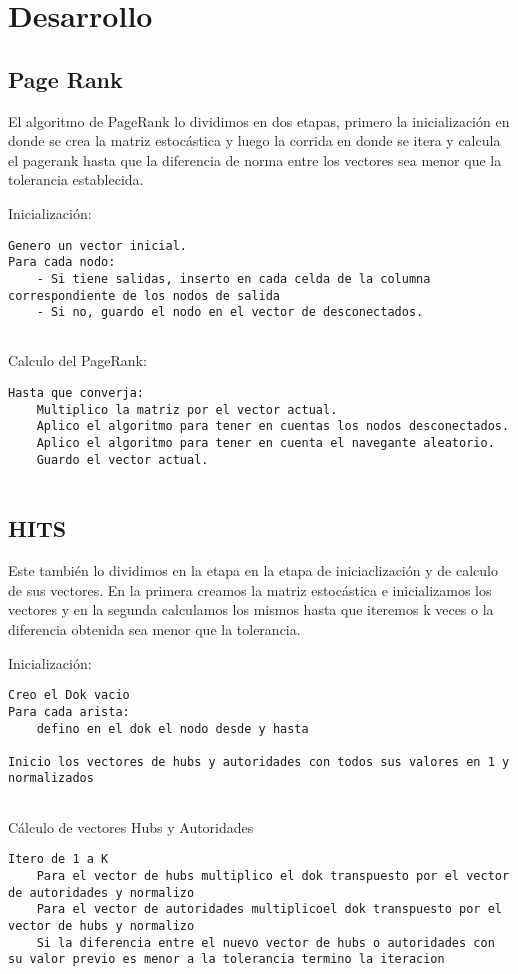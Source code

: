 \section{Desarrollo}

\subsection{Page Rank}
El algoritmo de PageRank lo dividimos en dos etapas, primero la inicializaci\'on en donde se crea la matriz estoc\'astica y luego la corrida en donde se itera y calcula el pagerank hasta que la diferencia de norma entre los vectores sea menor que la tolerancia establecida.

Inicializaci\'on:
\begin{lstlisting}[frame=single]  
Genero un vector inicial.
Para cada nodo:
	- Si tiene salidas, inserto en cada celda de la columna correspondiente de los nodos de salida
	- Si no, guardo el nodo en el vector de desconectados.
	
\end{lstlisting}

Calculo del PageRank:
\begin{lstlisting}[frame=single] 
Hasta que converja:
	Multiplico la matriz por el vector actual.
	Aplico el algoritmo para tener en cuentas los nodos desconectados.
	Aplico el algoritmo para tener en cuenta el navegante aleatorio.
	Guardo el vector actual.
	
\end{lstlisting}


\subsection{HITS}
Este también lo dividimos en la etapa en la etapa de iniciaclización y de calculo de sus vectores. En la primera creamos la matriz estocástica e inicializamos los vectores y en la segunda calculamos los mismos hasta que iteremos k veces o la diferencia obtenida sea menor que la tolerancia.

Inicializaci\'on:
\begin{lstlisting}[frame=single]  
Creo el Dok vacio
Para cada arista:
	defino en el dok el nodo desde y hasta
	
Inicio los vectores de hubs y autoridades con todos sus valores en 1 y normalizados
	
\end{lstlisting}

Cálculo de vectores Hubs y Autoridades
\begin{lstlisting}[frame=single] 
Itero de 1 a K
	Para el vector de hubs multiplico el dok transpuesto por el vector de autoridades y normalizo
	Para el vector de autoridades multiplicoel dok transpuesto por el vector de hubs y normalizo
	Si la diferencia entre el nuevo vector de hubs o autoridades con su valor previo es menor a la tolerancia termino la iteracion
\end{lstlisting}

